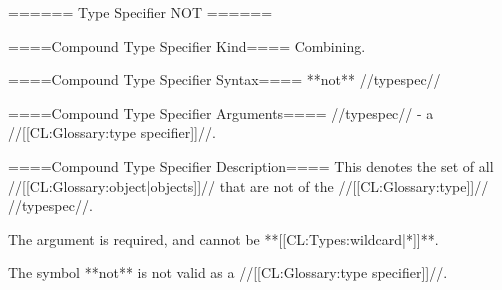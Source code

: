 ====== Type Specifier NOT ======

====Compound Type Specifier Kind====
Combining.

====Compound Type Specifier Syntax====
**not** //typespec//

====Compound Type Specifier Arguments====
//typespec// - a //[[CL:Glossary:type specifier]]//.

====Compound Type Specifier Description====
This denotes the set of all //[[CL:Glossary:object|objects]]// that are not of the //[[CL:Glossary:type]]// //typespec//.

The argument is required, and cannot be **[[CL:Types:wildcard|*]]**.

The symbol **not** is not valid as a //[[CL:Glossary:type specifier]]//.

